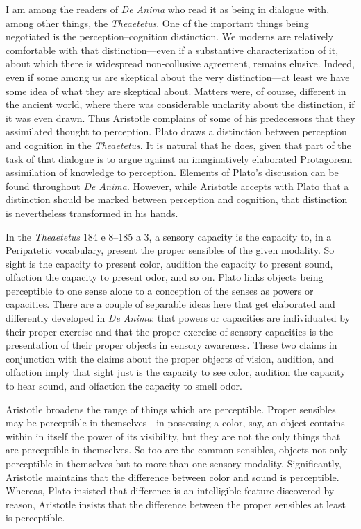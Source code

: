 \documentclass[12pt]{article}
\begin{document}
I am among the readers of \emph{De Anima} who read it as being in dialogue with, among other things, the \emph{Theaetetus}. One of the important things being negotiated is the perception--cognition distinction. We moderns are relatively comfortable with that distinction---even if a substantive characterization of it, about which there is widespread non-collusive agreement, remains elusive. Indeed, even if some among us are skeptical about the very distinction---at least we have some idea of what they are skeptical about. Matters were, of course, different in the ancient world, where there was considerable unclarity about the distinction, if it was even drawn. Thus Aristotle complains of some of his predecessors that they assimilated thought to perception. Plato draws a distinction between perception and cognition in the \emph{Theaetetus}. It is natural that he does, given that part of the task of that dialogue is to argue against an imaginatively elaborated Protagorean assimilation of knowledge to perception. Elements of Plato's discussion can be found throughout \emph{De Anima}. However, while Aristotle accepts with Plato that a distinction should be marked between perception and cognition, that distinction is nevertheless transformed in his hands.

In the \emph{Theaetetus} 184 e 8--185 a 3, a sensory capacity is the capacity to, in a Peripatetic vocabulary, present the proper sensibles of the given modality. So sight is the capacity to present color, audition the capacity to present sound, olfaction the capacity to present odor, and so on. Plato links objects being perceptible to one sense alone to a conception of the senses as powers or capacities. There are a couple of separable ideas here that get elaborated and differently developed in \emph{De Anima}: that powers or capacities are individuated by their proper exercise and that the proper exercise of sensory capacities is the presentation of their proper objects in sensory awareness. These two claims in conjunction with the claims about the proper objects of vision, audition, and olfaction imply that sight just is the capacity to see color, audition the capacity to hear sound, and olfaction the capacity to smell odor. 

Aristotle broadens the range of things which are perceptible. Proper sensibles may be perceptible in themselves---in possessing a color, say, an object contains within in itself the power of its visibility, but they are not the only things that are perceptible in themselves. So too are the common sensibles, objects not only perceptible in themselves but to more than one sensory modality. Significantly, Aristotle maintains that the difference between color and sound is perceptible. Whereas, Plato insisted that difference is an intelligible feature discovered by reason, Aristotle insists that the difference between the proper sensibles at least is perceptible.
\end{document}
